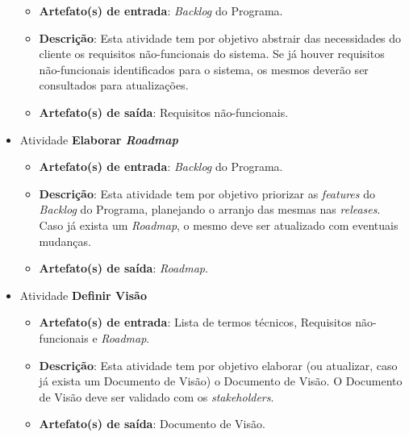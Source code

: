 \begin{itemize}
	  \begin{itemize}
	    \item \textbf{Artefato(s) de entrada}: \textit{Backlog} do Programa.
	    
	    \item \textbf{Descrição}: Esta atividade tem por objetivo abstrair das necessidades do cliente os
	      requisitos não-funcionais do sistema. Se já houver requisitos não-funcionais identificados para o sistema,
	      os mesmos deverão ser consultados para atualizações.
	    
	    \item \textbf{Artefato(s) de saída}: Requisitos não-funcionais.
		  
	  \end{itemize}
	  
     \item Atividade \textbf{Elaborar \textit{Roadmap}}
      
	  \begin{itemize}
	    \item \textbf{Artefato(s) de entrada}: \textit{Backlog} do Programa.
	    
	    \item \textbf{Descrição}: Esta atividade tem por objetivo priorizar as \textit{features} do
	      \textit{Backlog} do Programa, planejando o arranjo das mesmas nas \textit{releases}.  Caso já exista
	      um \textit{Roadmap}, o mesmo deve ser atualizado com eventuais mudanças.
	    
	    \item \textbf{Artefato(s) de saída}: \textit{Roadmap}.
		  
	  \end{itemize}
	  
     \item Atividade \textbf{Definir Visão}
      
	  \begin{itemize}
	    \item \textbf{Artefato(s) de entrada}: Lista de termos técnicos, Requisitos não-funcionais e \textit{Roadmap}.
	    
	    \item \textbf{Descrição}: Esta atividade tem por objetivo elaborar (ou atualizar, caso já exista um
	      Documento de Visão) o Documento de Visão. O Documento de Visão deve ser validado com os \textit{stakeholders}.
	    
	    \item \textbf{Artefato(s) de saída}: Documento de Visão.
		  

\end{itemize}
\end{itemize}
